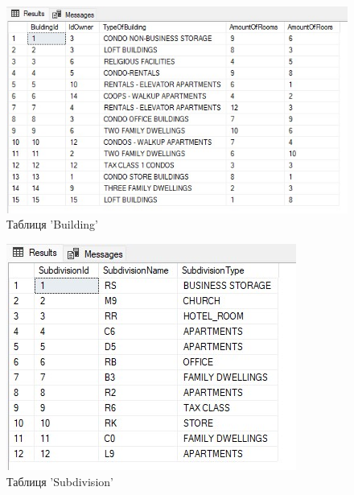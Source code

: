 \documentclass[a4paper,12pt]{article}
\begin{document}
	\begin{figure}[h!]
		\centering
		\begin{minipage}[h]{1\linewidth}
			\includegraphics[width=0.8\linewidth]{Prt sc/Figure_2.jpg}  
		\end{minipage}
		\caption{Таблиця 'Building'}
	\end{figure}
	
	\begin{figure}[h!]
		\centering
		\begin{minipage}[h]{1\linewidth}
			\includegraphics[width=0.8\linewidth]{Prt sc/Figure_3.jpg}  
		\end{minipage}
		\caption{Таблиця 'Subdivision'}
	\end{figure}

\newpage
	
\end{document}
